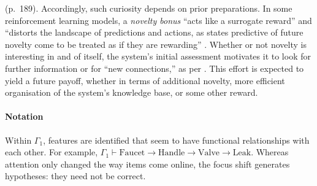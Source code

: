 \begin{description}
  (p.~189).  Accordingly, such curiosity depends on prior
  preparations.  In some reinforcement learning models, a
  \emph{novelty bonus} ``acts like a surrogate reward'' and ``distorts
  the landscape of predictions and actions, as states predictive of
  future novelty come to be treated as if they are rewarding''
  \cite[p.~554]{kakade2002dopamine}.  Whether or not novelty is
  interesting in and of itself, the system's initial assessment
  motivates it to look for further information or for ``new
  connections,'' as per \citet{Makri2012a}.  This effort is expected
  to yield a future payoff, whether in terms of additional novelty,
  more efficient organisation of the system's knowledge base, or some
  other reward.
\end{description}

\paragraph{\textbf{\upshape Notation}}

Within $\Gamma_1$, features are identified that seem to have
functional relationships with each other.  For example, $\Gamma_1
\vdash \mathrm{Faucet} \rightarrow \mathrm{Handle} \rightarrow
\mathrm{Valve} \rightarrow \mathrm{Leak}$. Whereas attention only
changed the way items come online, the focus shift generates
hypotheses: they need not be correct.


